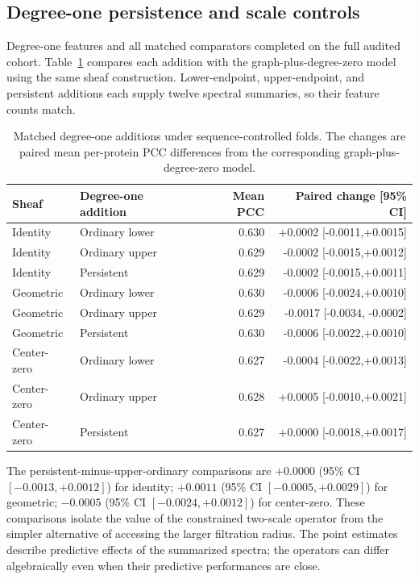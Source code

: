 \subsection{Degree-one persistence and scale controls}
Degree-one features and all matched comparators completed on the full audited cohort. Table~\ref{tab:persistence} compares each addition with the graph-plus-degree-zero model using the same sheaf construction. Lower-endpoint, upper-endpoint, and persistent additions each supply twelve spectral summaries, so their feature counts match.


\begin{table}[htbp]\centering\small
\caption{Matched degree-one additions under sequence-controlled folds. The changes are paired mean per-protein PCC differences from the corresponding graph-plus-degree-zero model.}
\label{tab:persistence}
\begin{tabular}{llrr}\toprule
Sheaf & Degree-one addition & Mean PCC & Paired change [95\% CI]\\\midrule
Identity & Ordinary lower & 0.630 & +0.0002 [-0.0011,\allowbreak +0.0015] \\
Identity & Ordinary upper & 0.629 & -0.0002 [-0.0015,\allowbreak +0.0012] \\
Identity & Persistent & 0.629 & -0.0002 [-0.0015,\allowbreak +0.0011] \\
Geometric & Ordinary lower & 0.630 & -0.0006 [-0.0024,\allowbreak +0.0010] \\
Geometric & Ordinary upper & 0.629 & -0.0017 [-0.0034, -0.0002] \\
Geometric & Persistent & 0.630 & -0.0006 [-0.0022,\allowbreak +0.0010] \\
Center-zero & Ordinary lower & 0.627 & -0.0004 [-0.0022,\allowbreak +0.0013] \\
Center-zero & Ordinary upper & 0.628 & +0.0005 [-0.0010,\allowbreak +0.0021] \\
Center-zero & Persistent & 0.627 & +0.0000 [-0.0018,\allowbreak +0.0017] \\
\bottomrule\end{tabular}\end{table}


\begin{samepage}
The persistent-minus-upper-ordinary comparisons are $+0.0000$ (95\% CI $[-0.0013,\allowbreak +0.0012]$) for identity; $+0.0011$ (95\% CI $[-0.0005,\allowbreak +0.0029]$) for geometric; $-0.0005$ (95\% CI $[-0.0024,\allowbreak +0.0012]$) for center-zero. These comparisons isolate the value of the constrained two-scale operator from the simpler alternative of accessing the larger filtration radius. The point estimates describe predictive effects of the summarized spectra; the operators can differ algebraically even when their predictive performances are close.
\par\end{samepage}

